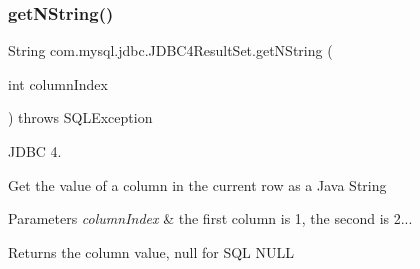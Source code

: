 \subsubsection{\texorpdfstring{get\+N\+String()}{getNString()}\hspace{0.1cm}{\footnotesize\ttfamily [1/2]}}
{\footnotesize\ttfamily String com.\+mysql.\+jdbc.\+J\+D\+B\+C4\+Result\+Set.\+get\+N\+String (\begin{DoxyParamCaption}\item[{int}]{column\+Index }\end{DoxyParamCaption}) throws S\+Q\+L\+Exception}

J\+D\+BC 4.

Get the value of a column in the current row as a Java String


\begin{DoxyParams}{Parameters}
{\em column\+Index} & the first column is 1, the second is 2...\\
\hline
\end{DoxyParams}
\begin{DoxyReturn}{Returns}
the column value, null for S\+QL N\+U\+LL
\end{DoxyReturn}

